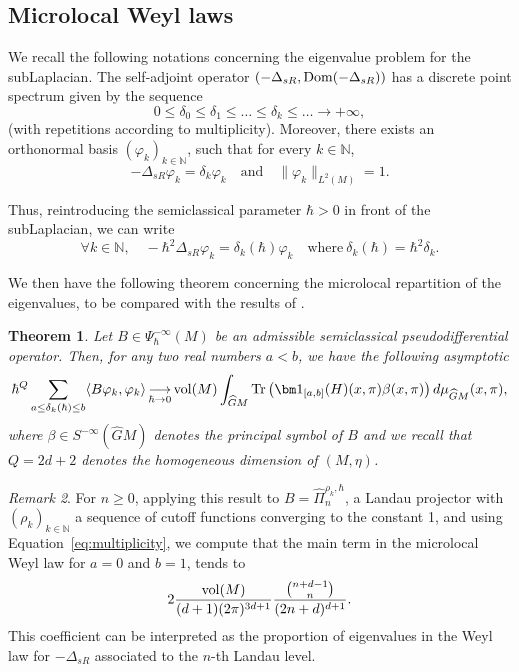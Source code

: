\documentclass[12pt,a4paper]{amsart}
\theoremstyle{plain}
\newtheorem{theorem}{Theorem}[section]
\theoremstyle{definition}
\theoremstyle{remark}
\newtheorem{remark}[theorem]{Remark}
\numberwithin{equation}{section}
\theoremstyle{definition}
\def\N{{\mathbb N}}%
\def \Ghat{\widehat{G}}
\def\Tend#1#2{\mathop{\longrightarrow}\limits_{#1\rightarrow#2}}
\numberwithin{equation}{section}
\begin{document}
\subsection{Microlocal Weyl laws}

We recall the following notations concerning the eigenvalue problem for the subLaplacian. The self-adjoint operator $(-\Delta_{sR},{\rm Dom}(-\Delta_{sR}))$ has a discrete point spectrum given by the sequence 
\begin{equation*}
    0\leq \delta_0\leq \delta_1\leq \dots\leq\delta_k\leq\dots\rightarrow +\infty,
\end{equation*} 
(with repetitions according to multiplicity). Moreover, there exists an orthonormal basis $(\varphi_k)_{k\in\N}$, such that for every $k\in \N$,
\begin{equation*}
    -\Delta_{sR}\varphi_k = \delta_k \varphi_k \quad\mbox{and}\quad \|\varphi_k\|_{L^2(M)} = 1.
\end{equation*}

Thus, reintroducing the semiclassical parameter $\hbar>0$ in front of the subLaplacian, we can write
\begin{equation*}
    \forall k\in \N,\quad -\hbar^2\Delta_{sR}\varphi_k = \delta_k(\hbar)\varphi_k\quad\mbox{where}\ \delta_k(\hbar) = \hbar^2\delta_k.
\end{equation*}

We then have the following theorem concerning the microlocal repartition of the eigenvalues, to be compared with the results of \cite{Tay20}.

\begin{theorem}
    \label{thm:microlocalweyllaw}
    Let $B\in \Psi_\hbar^{-\infty}(M)$ be an admissible semiclassical pseudodifferential operator. Then, for any two real numbers $a < b$, we have the following asymptotic
    \begin{equation*}
        \hbar^{Q} \sum_{a\leq \delta_k(\hbar)\leq b}\langle B\varphi_k,\varphi_k\rangle \Tend{\hbar}{0} {\rm vol}(M)\int_{\Ghat M} {\rm Tr}\left({\bm 1}_{[a,b]}(H)(x,\pi)\beta(x,\pi)\right) d\mu_{\Ghat M}(x,\pi),
    \end{equation*}
    where $\beta \in S^{-\infty}(\Ghat M)$ denotes the principal symbol of $B$ and we recall that $Q = 2d+2$ denotes the \emph{homogeneous dimension} of $(M,\eta)$.
\end{theorem}

\begin{remark}
    For $n\geq 0$, applying this result to $B = \hat{\Pi}_n^{\rho_k,\hbar}$, a Landau projector with $(\rho_k)_{k\in\N}$ a sequence of cutoff functions converging to the constant 1, and using Equation~\eqref{eq:multiplicity}, we compute that the main term in the microlocal Weyl law for $a=0$ and $b=1$, tends to 
    \begin{equation*}
        2\frac{{\rm vol}(M)}{(d+1)(2\pi)^{3d+1}}\frac{\binom{n+d-1}{n}}{(2n+d)^{d+1}}.
    \end{equation*}
    This coefficient can be interpreted as the proportion of eigenvalues in the Weyl law for $-\Delta_{sR}$ associated to the $n$-th Landau level.
\end{remark}
\end{document}
